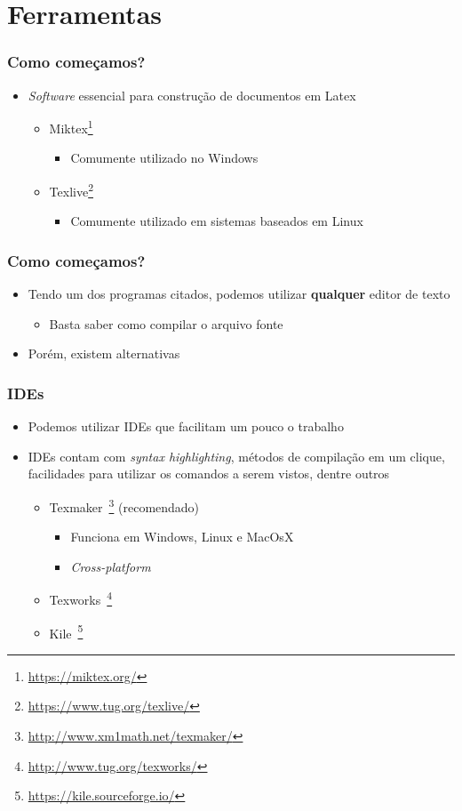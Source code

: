 \section{Ferramentas}

\begin{frame}[fragile] \frametitle{Como começamos?}
\begin{itemize}
	\item \textit{Software} essencial para construção de documentos em Latex
	\begin{itemize}
		\item Miktex\footnote{\url{https://miktex.org/}}
		\begin{itemize}
			\item Comumente utilizado no Windows
		\end{itemize}
		\item Texlive\footnote{\url{https://www.tug.org/texlive/}}
		\begin{itemize}
			\item Comumente utilizado em sistemas baseados em Linux
		\end{itemize}
	\end{itemize}
\end{itemize}
\end{frame}

\begin{frame}[fragile] \frametitle{Como começamos?}
\begin{itemize}
	\item Tendo um dos programas citados, podemos utilizar \textbf{qualquer} editor de texto
	\begin{itemize}
		\item Basta saber como compilar o arquivo fonte
	\end{itemize}
	\item Porém, existem alternativas
\end{itemize}
\end{frame}

\begin{frame}[fragile] \frametitle{IDEs}
\begin{itemize}
	\item Podemos utilizar IDEs que facilitam um pouco o trabalho
	\item IDEs contam com \textit{syntax highlighting}, métodos de compilação em um clique, facilidades para utilizar os comandos a serem vistos, dentre outros
	\begin{itemize}
		\item Texmaker~\footnote{\url{http://www.xm1math.net/texmaker/}} (recomendado)
		\begin{itemize}
			\item Funciona em Windows, Linux e MacOsX
			\item \textit{Cross-platform}
		\end{itemize}
		\item Texworks~\footnote{\url{http://www.tug.org/texworks/}}
		\item Kile~\footnote{\url{https://kile.sourceforge.io/}}
	\end{itemize}
\end{itemize}
\end{frame}

